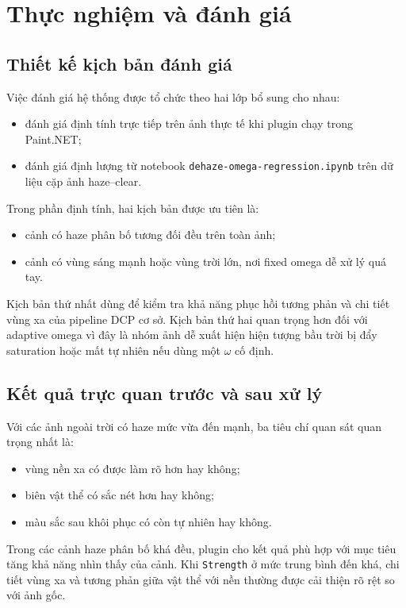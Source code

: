 \section{Thực nghiệm và đánh giá}

\subsection{Thiết kế kịch bản đánh giá}

Việc đánh giá hệ thống được tổ chức theo hai lớp bổ sung cho nhau:
\begin{itemize}
\item đánh giá định tính trực tiếp trên ảnh thực tế khi plugin chạy trong Paint.NET;
\item đánh giá định lượng từ notebook \texttt{dehaze-omega-regression.ipynb} trên dữ liệu cặp ảnh haze--clear.
\end{itemize}

Trong phần định tính, hai kịch bản được ưu tiên là:
\begin{itemize}
\item cảnh có haze phân bố tương đối đều trên toàn ảnh;
\item cảnh có vùng sáng mạnh hoặc vùng trời lớn, nơi fixed omega dễ xử lý quá tay.
\end{itemize}

Kịch bản thứ nhất dùng để kiểm tra khả năng phục hồi tương phản và chi tiết vùng xa của pipeline DCP cơ sở. Kịch bản thứ hai quan trọng hơn đối với adaptive omega vì đây là nhóm ảnh dễ xuất hiện hiện tượng bầu trời bị đẩy saturation hoặc mất tự nhiên nếu dùng một \(\omega\) cố định.

\subsection{Kết quả trực quan trước và sau xử lý}

Với các ảnh ngoài trời có haze mức vừa đến mạnh, ba tiêu chí quan sát quan trọng nhất là:
\begin{itemize}
\item vùng nền xa có được làm rõ hơn hay không;
\item biên vật thể có sắc nét hơn hay không;
\item màu sắc sau khôi phục có còn tự nhiên hay không.
\end{itemize}

Trong các cảnh haze phân bố khá đều, plugin cho kết quả phù hợp với mục tiêu tăng khả năng nhìn thấy của cảnh. Khi \texttt{Strength} ở mức trung bình đến khá, chi tiết vùng xa và tương phản giữa vật thể với nền thường được cải thiện rõ rệt so với ảnh gốc.

